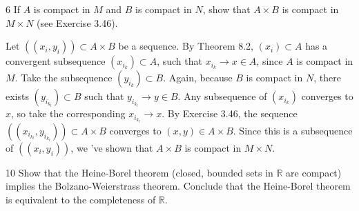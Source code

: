 \begin{exercise}{6}
    If $A$ is compact in $M$ and $B$ is compact in $N$, show that $A \times B$ is compact in $M \times N$ (see Exercise 3.46).
\end{exercise}

\begin{solution}
    
    Let $((x_i, y_i)) \subset A \times B$ be a sequence.
    By Theorem 8.2, $(x_i) \subset A$ has a convergent subsequence $(x_{i_k}) \subset A$, such that $x_{i_k} \rightarrow x \in A$, since $A$ is compact in $M$.
    Take the subsequence $(y_{i_k}) \subset B$.
    Again, because $B$ is compact in $N$, there exists $(y_{i_{k_l}}) \subset B$ such that $y_{i_{k_l}} \rightarrow y \in B$.
    Any subsequence of $(x_{i_k})$ converges to $x$, so take the corresponding $x_{i_{k_l}} \rightarrow x$.
    By Exercise 3.46, the sequence $((x_{i_{k_l}}, y_{i_{k_l}})) \subset A \times B$ converges to $(x, y) \in A \times B$.
    Since this is a subsequence of $((x_i, y_i))$, we 've shown that $A \times B$ is compact in $M \times N$.
\end{solution}

\begin{exercise}{10}
    Show that the Heine-Borel theorem (closed, bounded sets in $\mathbb{R}$ are compact) implies the Bolzano-Weierstrass theorem.
    Conclude that the Heine-Borel theorem is equivalent to the completeness of $\mathbb{R}$.
\end{exercise}

